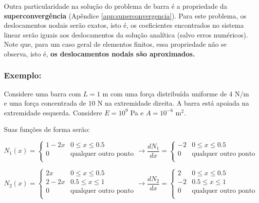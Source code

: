             Outra particularidade na solução do problema de barra é a propriedade da \textbf{superconvergência} (Apêndice \ref{app:superconvergencia}). Para este problema, os deslocamentos nodais serão exatos, isto é, os coeficientes encontrados no sistema linear serão iguais aos deslocamentos da solução analítica (salvo erros numéricos). Note que, para um caso geral de elementos finitos, essa propriedade não se observa, isto é, \textbf{os deslocamentos nodais são aproximados.}

        \subsubsection*{Exemplo:}

            Considere uma barra com $L=1$ m com uma força distribuída uniforme de $4$ N/m e uma força concentrada de $10$ N na extremidade direita. A barra está apoiada na extremidade esquerda. Considere $E = 10^9$ Pa e $A = 10^{-6}$ m$^2$.

            Suas funções de forma serão:

            \begin{equation*}
            N_1(x) = 
            \left\{
            \begin{array}{cl}
                1-2x & 0 \leq x \leq 0.5\\
                0 & \text{qualquer outro ponto}\\
            \end{array}
            \right.
            \rightarrow
            \frac{dN_1}{dx} = 
            \left\{
            \begin{array}{cl}
                -2 & 0 \leq x \leq 0.5\\
                0 & \text{qualquer outro ponto}\\
            \end{array}
            \right.
        \end{equation*}

        \begin{equation*}
            N_2(x) = 
            \left\{
            \begin{array}{cl}
                2x & 0 \leq x \leq 0.5\\
                2-2x & 0.5 \leq x \leq 1\\
                0 & \text{qualquer outro ponto}\\
            \end{array}
            \right.
            \rightarrow
            \frac{dN_2}{dx} = 
            \left\{
            \begin{array}{cl}
                2 & 0 \leq x \leq 0.5\\
                -2 & 0.5 \leq x \leq 1\\
                0 & \text{qualquer outro ponto}\\
            \end{array}
            \right.
        \end{equation*}

